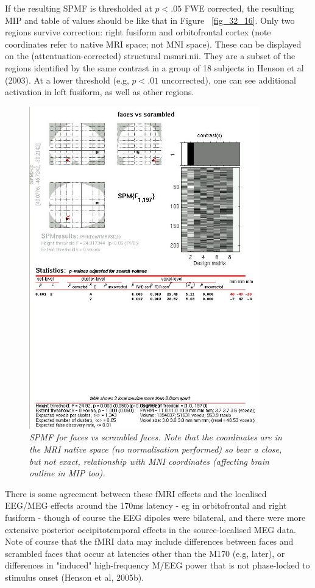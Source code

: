 If the resulting SPM{F} is thresholded at $p<.05$ FWE corrected, the resulting MIP and table of values should be like that in Figure ~\ref{fig_32_16}. Only two regions survive correction: right fusiform and orbitofrontal cortex (note coordinates refer to native MRI space; not MNI space). These can be displayed on the (attentuation-corrected) structural msmri.nii. They are a subset of the regions identified by the same contrast in a group of 18 subjects in Henson et al (2003). At a lower threshold (e.g, $p<.01$ uncorrected), one can see additional activation in left fusiform, as well as other regions.


\begin{figure}
\begin{center}
\includegraphics[width=100mm]{multimodal/figures/figure_32_22}
\caption{\em  SPM{F} for faces vs scrambled faces. Note that the coordinates are in the MRI native space (no normalisation performed) so bear a close, but not exact, relationship with MNI coordinates (affecting brain outline in MIP too).\label{fig_32_22}}
\end{center}
\end{figure}

There is some agreement between these fMRI effects and the localised EEG/MEG effects around the 170ms latency - eg in orbitofrontal and right fusiform - though of course the EEG dipoles were bilateral, and there were more extensive posterior occipitotemporal effects in the source-localised MEG data. Note of course that the fMRI data may include differences between faces and scrambled faces that occur at latencies other than the M170 (e.g, later), or differences in "induced" high-frequency M/EEG power that is not phase-locked to stimulus onset (Henson et al, 2005b).

